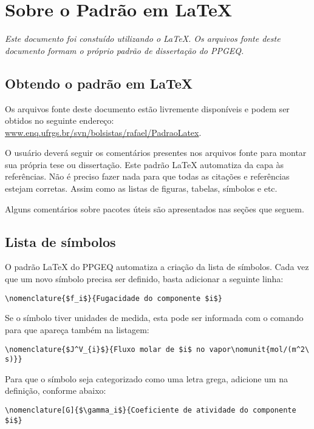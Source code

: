 %
%
%
\chapter{Sobre o Padrão em \LaTeX{}}

\emph{Este documento foi constuído utilizando o \LaTeX{}.
Os arquivos fonte deste documento formam o próprio padrão de dissertação
do PPGEQ.}

\section{Obtendo o padrão em \LaTeX{}}

Os arquivos fonte deste documento estão livremente disponíveis e podem ser obtidos no seguinte endereço:
\href{http://www.enq.ufrgs.br/svn/bolsistas/rafael/PadraoLatex}{www.enq.ufrgs.br/svn/bolsistas/rafael/PadraoLatex}.

O usuário deverá seguir os comentários presentes nos arquivos fonte para montar
sua própria tese ou dissertação.
Este padrão \LaTeX{} automatiza da capa às referências.
Não é preciso fazer nada para que todas as citações e referências estejam corretas.
Assim como as listas de figuras, tabelas, símbolos e etc.

Alguns comentários sobre pacotes úteis são apresentados nas seções que seguem.

\section{Lista de símbolos}

O padrão \LaTeX{} do PPGEQ automatiza a criação da lista de símbolos.
Cada vez que um novo símbolo precisa ser definido, basta adicionar a seguinte linha:
\begin{lstlisting}[numbers=none]
\nomenclature{$f_i$}{Fugacidade do componente $i$}
\end{lstlisting}

Se o símbolo tiver unidades de medida, esta pode ser informada
com o comando  para que apareça também na listagem:
\begin{lstlisting}[numbers=none]
\nomenclature{$J^V_{i}$}{Fluxo molar de $i$ no vapor\nomunit{mol/(m^2\ s)}}
\end{lstlisting}


Para que o símbolo seja categorizado como uma letra grega, adicione um  na definição,
conforme abaixo:
\begin{lstlisting}[numbers=none]
\nomenclature[G]{$\gamma_i$}{Coeficiente de atividade do componente $i$}
\end{lstlisting}

